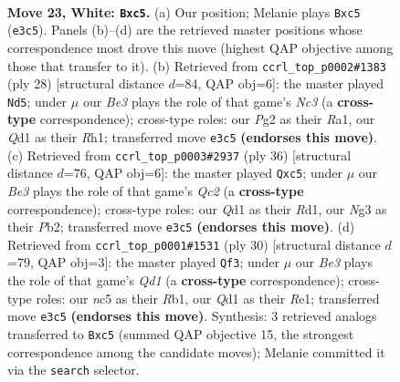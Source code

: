 \documentclass[11pt]{article}
\begin{document}
\clearpage

\begin{figure}[p]\centering
\begin{subfigure}{0.46\textwidth}\centering
\resizebox{\linewidth}{!}{%
\newchessgame
\chessboard[
  setfen={r1b2kr1/1p2bp1p/p5p1/2npq3/8/3KBPN1/PP4PP/1R1Q1B1R w - - 0 23},
  showmover=false,
  pgfstyle=straightmove, color=movearrow, markmove={e3-c5}
]}
\caption{}
\end{subfigure}\hfill
\begin{subfigure}{0.46\textwidth}\centering
\resizebox{\linewidth}{!}{%
\newchessgame
\chessboard[
  setfen={1r2kb1r/5p1p/p2pbp2/1pq5/4P3/P1N2Q2/1PP1B1PP/R3K2R w KQk - 0 15},
  showmover=false,
  pgfstyle=straightmove, color=movearrow, markmove={c3-d5}
]}
\caption{}
\end{subfigure}
\\[4pt]
\begin{subfigure}{0.46\textwidth}\centering
\resizebox{\linewidth}{!}{%
\newchessgame
\chessboard[
  setfen={5rk1/5ppp/r2bp3/p1qp4/4n3/4PN1P/PPQB1PP1/2RR2K1 w - - 0 19},
  showmover=false,
  pgfstyle=straightmove, color=movearrow, markmove={c2-c5}
]}
\caption{}
\end{subfigure}\hfill
\begin{subfigure}{0.46\textwidth}\centering
\resizebox{\linewidth}{!}{%
\newchessgame
\chessboard[
  setfen={r1b1k2r/1p2bppp/p1n5/3qp3/4N2P/3B4/P1PB1PP1/1R1QR1K1 w kq - 2 16},
  showmover=false,
  pgfstyle=straightmove, color=movearrow, markmove={d1-f3}
]}
\caption{}
\end{subfigure}
\caption{\textbf{Move 23, White: \texttt{Bxc5}.} (a) Our position; Melanie plays \texttt{Bxc5} (\texttt{e3c5}). Panels (b)--(d) are the retrieved master positions whose correspondence most drove this move (highest QAP objective among those that transfer to it). (b) Retrieved from \texttt{ccrl\_top\_p0002\#1383} (ply 28) [structural distance $d$=84, QAP obj=6]: the master played \texttt{Nd5}; under $\mu$ our \emph{Be3} plays the role of that game's \emph{Nc3} (a \textbf{cross-type} correspondence); cross-type roles: our \emph{P}g2 as their \emph{R}a1, our \emph{Q}d1 as their \emph{R}h1; transferred move \texttt{e3c5} \textbf{(endorses this move)}. (c) Retrieved from \texttt{ccrl\_top\_p0003\#2937} (ply 36) [structural distance $d$=76, QAP obj=6]: the master played \texttt{Qxc5}; under $\mu$ our \emph{Be3} plays the role of that game's \emph{Qc2} (a \textbf{cross-type} correspondence); cross-type roles: our \emph{Q}d1 as their \emph{R}d1, our \emph{N}g3 as their \emph{P}b2; transferred move \texttt{e3c5} \textbf{(endorses this move)}. (d) Retrieved from \texttt{ccrl\_top\_p0001\#1531} (ply 30) [structural distance $d$=79, QAP obj=3]: the master played \texttt{Qf3}; under $\mu$ our \emph{Be3} plays the role of that game's \emph{Qd1} (a \textbf{cross-type} correspondence); cross-type roles: our \emph{n}c5 as their \emph{R}b1, our \emph{Q}d1 as their \emph{R}e1; transferred move \texttt{e3c5} \textbf{(endorses this move)}. Synthesis: 3 retrieved analogs transferred to \texttt{Bxc5} (summed QAP objective 15, the strongest correspondence among the candidate moves); Melanie committed it via the \texttt{search} selector.}
\label{fig:thought-m44}
\end{figure}
\end{document}
